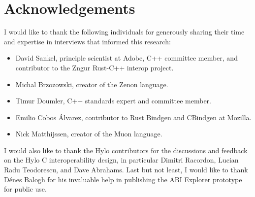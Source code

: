 \section*{Acknowledgements}
I would like to thank the following individuals for generously sharing their time and expertise in interviews that informed this research:
\begin{itemize}
    \item David Sankel, principle scientist at Adobe, C++ committee member, and contributor to the Zngur Rust-C++ interop project\cite{zngur}.
    \item Michal Brzozowski, creator of the Zenon language\cite{zenon-lang}.
    \item Timur Doumler, C++ standards expert and committee member.
    \item Emilio Cobos Álvarez, contributor to Rust Bindgen\cite{rust-bindgen} and CBindgen\cite{cbindgen} at Mozilla.
    \item Nick Matthijssen, creator of the Muon language.
\end{itemize}
I would also like to thank the Hylo contributors for the discussions and feedback on the Hylo C interoperability design, in particular Dimitri Racordon, Lucian Radu Teodorescu, and Dave Abrahams. Last but not least, I would like to thank Dénes Balogh for his invaluable help in publishing the ABI Explorer prototype for public use\cite{abi-explorer}.